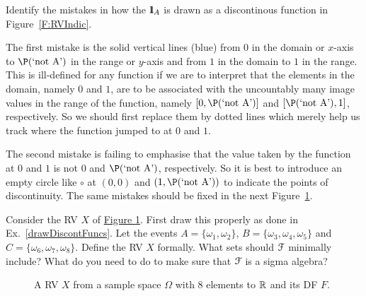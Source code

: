 \begin{Exercise}[title={Drawing discontinuous functions},label={drawDiscontFuncs}]
Identify the mistakes in how the  ${1}\mspace{-11 mu}{1}_A$ is drawn as a discontinous function in Figure~\ref{F:RVIndic}.
\end{Exercise}
\begin{Answer}
The first mistake is the solid vertical lines (blue) from $0$ in the domain or $x$-axis to $\P( \text{`not A'})$ in the range or $y$-axis and from $1$ in the domain to $1$ in the range. 
This is ill-defined for any function if we are to interpret that the elements in the domain, namely $0$ and $1$, are to be associated with the uncountably many image values in the range of the function, namely $[0,\P( \text{`not A'})]$ and $[\P( \text{`not A'}),1]$, respectively. 
So we should first replace them by dotted lines which merely help us track where the function jumped to at $0$ and $1$.

The second mistake is failing to emphasise that the value taken by the function at $0$ and $1$ is not $0$ and $\P( \text{`not A'})$, respectively. So it is best to introduce an empty circle like $\circ$ at $(0,0)$ and $(1,\P( \text{`not A'}))$ to indicate the points of discontinuity. The same mistakes should be fixed in the next Figure~\ref{F:RVABC}.
\end{Answer}

\begin{classwork}\label{CW:ARVwith3Values}
Consider the RV $X$ of \hyperref[F:RVABC]{Figure \ref*{F:RVABC}}.  First draw this properly as done in Ex.~\ref{drawDiscontFuncs}. Let the events $A = \{\omega_1, \omega_2\}$, $B = \{\omega_3, \omega_4, \omega_5\}$ and $C = \{\omega_6, \omega_7,\omega_8 \}$.  Define the RV $X$ formally.  What sets should $\mathcal{F}$ minimally include?  What do you need to do to make sure that $\mathcal{F}$ is a sigma algebra?
\end{classwork}
\begin{figure}[htpb]
\caption{A RV $X$ from a sample space $\Omega$ with $8$ elements to $\mathbb{R}$ and its DF $F$.\label{F:RVABC}}
\centering   {}
\end{figure}

